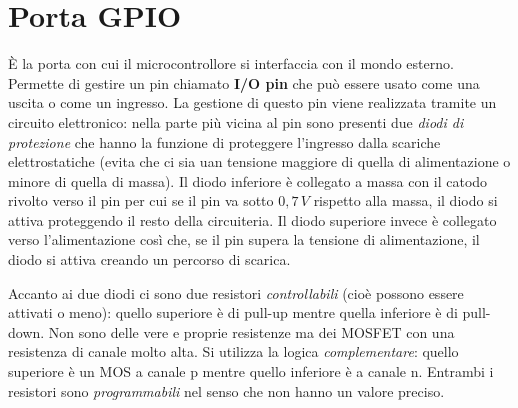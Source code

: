 \documentclass[12pt, a4paper]{report}
\begin{document}
\section{Porta GPIO}
È la porta con cui il microcontrollore si interfaccia con il mondo esterno. Permette di gestire un pin chiamato \textbf{I/O pin} che può essere usato come una uscita o come un ingresso. La gestione di questo pin viene realizzata tramite un circuito elettronico: nella parte più vicina al pin sono presenti due \textit{diodi di protezione} che hanno la funzione di proteggere l'ingresso dalla scariche elettrostatiche (evita che ci sia uan tensione maggiore di quella di alimentazione o minore di quella di massa). Il diodo inferiore è collegato a massa con il catodo rivolto verso il pin per cui se il pin va sotto $0,7\,V$ rispetto alla massa, il diodo si attiva proteggendo il resto della circuiteria. Il diodo superiore invece è collegato verso l'alimentazione così che, se il pin supera la tensione di alimentazione, il diodo si attiva creando un percorso di scarica.

Accanto ai due diodi ci sono due resistori \textit{controllabili} (cioè possono essere attivati o meno): quello superiore è di pull-up mentre quella inferiore è di pull-down. Non sono delle vere e proprie resistenze ma dei MOSFET con una resistenza di canale molto alta. Si utilizza la logica \textit{complementare}: quello superiore è un MOS a canale p mentre quello inferiore è a canale n. Entrambi i resistori sono \textit{programmabili} nel senso che non hanno un valore preciso.
\end{document}
